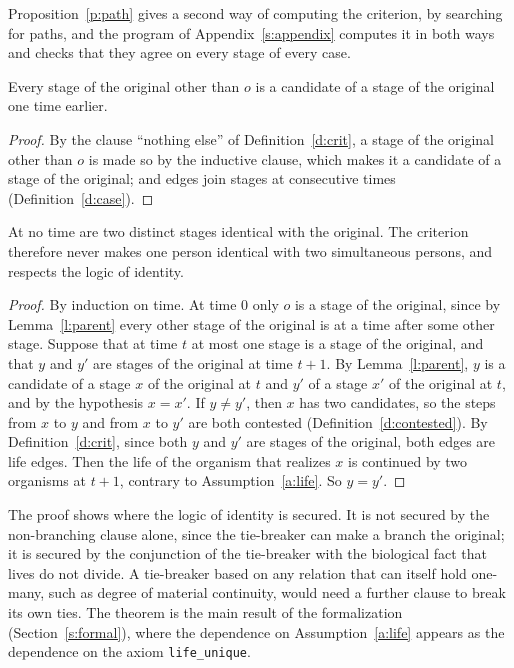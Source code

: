 \documentclass{situationist-preprint}
\begin{document}
Proposition~\ref{p:path} gives a second way of computing the criterion, by searching for paths, and the program of Appendix~\ref{s:appendix} computes it in both ways and checks that they agree on every stage of every case.

\begin{lemma}\label{l:parent}
Every stage of the original other than $o$ is a candidate of a stage of the original one time earlier.
\end{lemma}

\begin{proof}
By the clause \enquote{nothing else} of Definition~\ref{d:crit}, a stage of the original other than $o$ is made so by the inductive clause, which makes it a candidate of a stage of the original; and edges join stages at consecutive times (Definition~\ref{d:case}).
\end{proof}

\begin{theorem}[Uniqueness]\label{t:unique}
At no time are two distinct stages identical with the original. The criterion therefore never makes one person identical with two simultaneous persons, and respects the logic of identity.
\end{theorem}

\begin{proof}
By induction on time. At time $0$ only $o$ is a stage of the original, since by Lemma~\ref{l:parent} every other stage of the original is at a time after some other stage. Suppose that at time $t$ at most one stage is a stage of the original, and that $y$ and $y'$ are stages of the original at time $t+1$. By Lemma~\ref{l:parent}, $y$ is a candidate of a stage $x$ of the original at $t$ and $y'$ of a stage $x'$ of the original at $t$, and by the hypothesis $x = x'$. If $y \neq y'$, then $x$ has two candidates, so the steps from $x$ to $y$ and from $x$ to $y'$ are both contested (Definition~\ref{d:contested}). By Definition~\ref{d:crit}, since both $y$ and $y'$ are stages of the original, both edges are life edges. Then the life of the organism that realizes $x$ is continued by two organisms at $t+1$, contrary to Assumption~\ref{a:life}. So $y = y'$.
\end{proof}

The proof shows where the logic of identity is secured. It is not secured by the non-branching clause alone, since the tie-breaker can make a branch the original; it is secured by the conjunction of the tie-breaker with the biological fact that lives do not divide. A tie-breaker based on any relation that can itself hold one-many, such as degree of material continuity, would need a further clause to break its own ties. The theorem is the main result of the formalization (Section~\ref{s:formal}), where the dependence on Assumption~\ref{a:life} appears as the dependence on the axiom \texttt{life\_unique}.
\end{document}
